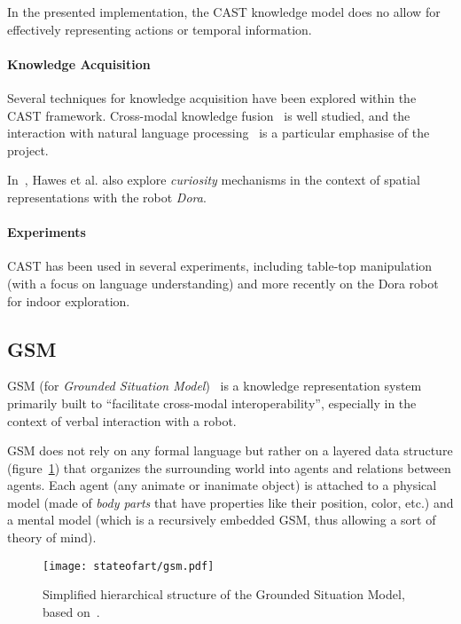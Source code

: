In the presented implementation, the CAST knowledge model does no allow for
effectively representing actions or temporal information.

\paragraph{Knowledge Acquisition} Several techniques for knowledge acquisition
have been explored within the CAST framework. Cross-modal knowledge
fusion~\cite{Hawes2007a} is well studied, and the interaction with natural
language processing~\cite{Kruijff2010, Kruijff2010a} is a particular emphasise
of the project.

In~\cite{Hawes2011}, Hawes et al. also explore \emph{curiosity} mechanisms in
the context of spatial representations with the robot \emph{Dora}.

\paragraph{Experiments} CAST has been used in several experiments, including
table-top manipulation (with a focus on language understanding) and more
recently on the Dora robot~\cite{Hawes2011} for indoor exploration.

\subsection{GSM}
\label{sect|gsm}

GSM (for \emph{Grounded Situation Model})~\cite{Mavridis2006} is a knowledge
representation system primarily built to ``facilitate cross-modal
interoperability'',  especially in the context of verbal interaction with a
robot.

GSM does not rely on any formal language but rather on a layered data structure
(figure~\ref{fig|gsm}) that organizes the surrounding world into agents and
relations between agents.  Each agent (any animate or inanimate object) is
attached to a physical model (made of \emph{body parts} that have properties
like their position, color, etc.) and a mental model (which is a recursively
embedded GSM, thus allowing a sort of theory of mind).

\begin{figure}
    \centering
    \texttt{[image: stateofart/gsm.pdf]}

    \caption{Simplified hierarchical structure of the Grounded Situation Model,
    based on~\cite{Mavridis2006}.}

    \label{fig|gsm}
\end{figure}

